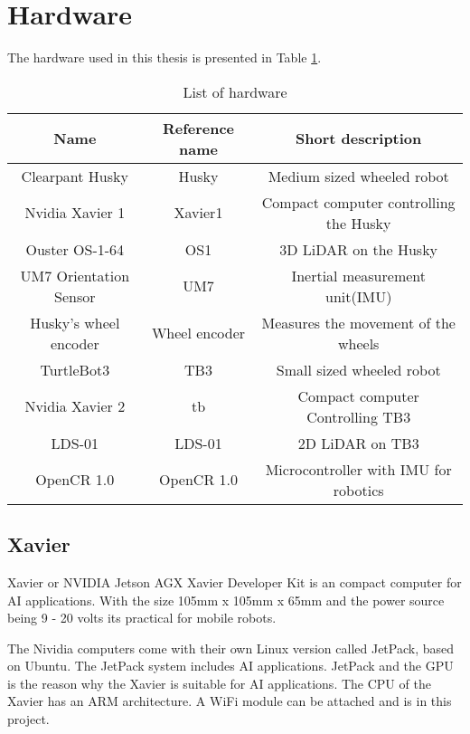 \section{Hardware}

The hardware used in this thesis is presented in Table \ref{tab:HW_list}.

\begin{table}[H]
    \centering
    \begin{tabular}{c|c|c}
        Name                    & Reference name    & Short description  \\ \hline
        Clearpant Husky         & Husky             & Medium sized wheeled robot \\
        Nvidia Xavier 1         & Xavier1           & Compact computer controlling the Husky\\
        Ouster OS-1-64          & OS1               & 3D LiDAR on the Husky \\
        UM7 Orientation Sensor  & UM7               & Inertial measurement unit(IMU)  \\
        Husky's wheel encoder   & Wheel encoder     & Measures the movement of the wheels\\
        TurtleBot3              & TB3               & Small sized wheeled robot   \\
        Nvidia Xavier 2         & tb                & Compact computer Controlling TB3  \\
        LDS-01                  & LDS-01            & 2D LiDAR on TB3 \\
        OpenCR 1.0              & OpenCR 1.0        & Microcontroller with IMU for robotics \\
        
    \end{tabular}
    \caption{List of hardware}
    \label{tab:HW_list}
\end{table}

\subsection{Xavier}
Xavier or NVIDIA Jetson AGX Xavier Developer Kit \cite{xavierguide} is an compact computer for AI applications. With the size 105mm x 105mm x 65mm and the power source being 9 - 20 volts its practical for mobile robots. 

The Nividia computers come with their own Linux version called JetPack, based on Ubuntu. The JetPack system includes AI applications. JetPack and the GPU is the reason why the Xavier is suitable for AI applications. The CPU of the Xavier has an ARM architecture. A WiFi module can be attached and is in this project.


